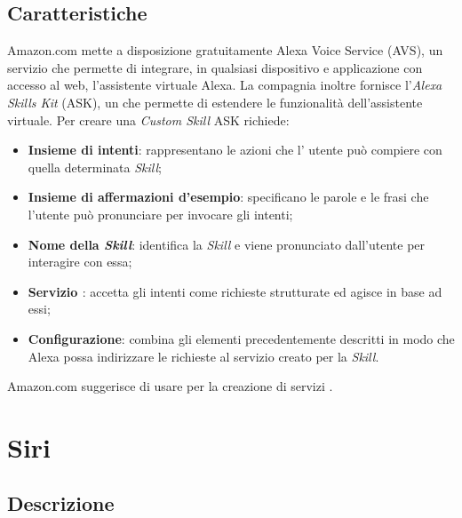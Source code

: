 \documentclass[a4paper,titlepage]{article}
\begin{document}
	\subsection{Caratteristiche}
		Amazon.com mette a disposizione gratuitamente Alexa Voice Service (AVS), un servizio che permette di integrare, in qualsiasi dispositivo e applicazione con accesso al web, l'assistente virtuale Alexa. La compagnia inoltre fornisce l'\textit{Alexa Skills Kit} (ASK), un  che permette di estendere le funzionalità dell'assistente virtuale. Per creare una \textit{Custom Skill} ASK richiede:
		\begin{itemize}
			\item \textbf{Insieme di intenti}: rappresentano le azioni che l' utente può compiere con quella determinata \textit{Skill}; 
			\item \textbf{Insieme di affermazioni d'esempio}: specificano le parole e le frasi che l'utente può pronunciare per invocare gli intenti;
			\item \textbf{Nome della \textit{Skill}}: identifica la \textit{Skill} e viene pronunciato dall'utente per interagire con essa;
			\item \textbf{Servizio \textit{}}: accetta gli intenti come richieste strutturate ed agisce in base ad essi;
			\item \textbf{Configurazione}: combina gli elementi precedentemente descritti in modo che Alexa possa indirizzare le richieste al servizio creato per la \textit{Skill}.
			
		\end{itemize}
	Amazon.com suggerisce di usare  per la creazione di servizi \textit{}.
		
	
\newpage	
	\section{Siri}
	\subsection{Descrizione}
	
\end{document}

